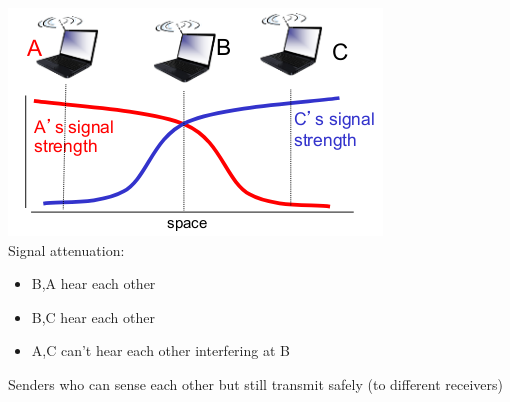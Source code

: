 \documentclass{article}[18pt]
\begin{document}
\begin{minipage}{0.5\textwidth}
\includegraphics[scale=0.7]{"signal attenuation"}\\
Signal attenuation:
\begin{itemize}
	\item B,A hear each other
	\item B,C hear each other
	\item A,C can't hear each other interfering at B
\end{itemize}
\end{minipage}
\begin{defin}
Senders who can sense each other but still transmit safely (to different receivers)
\end{defin}
\end{document}
